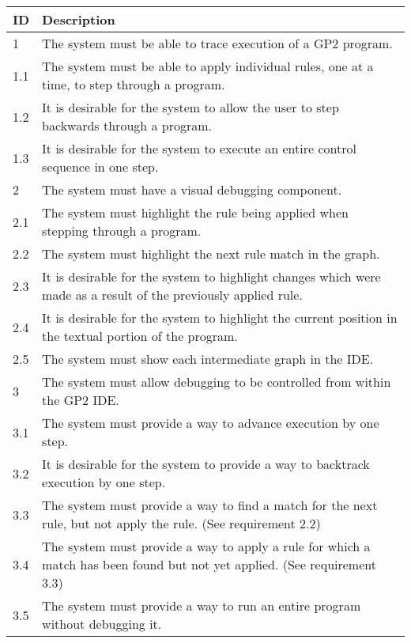 \documentclass[authoryearcitations]{UoYCSproject}
\begin{document}
\begin{table}[tbp]
    \begin{tabularx}{\linewidth}{|l|X|}
        \hline
        \textbf{ID} & \textbf{Description} \\
        \hline
        1    &  The system must be able to trace execution of a GP2 program. \\ \hline
        1.1  &  The system must be able to apply individual rules, one at a time,
                to step through a program. \\ \hline
        1.2  &  It is desirable for the system to allow the user to step
                backwards through a program. \\ \hline
        1.3  &  It is desirable for the system to execute an entire control sequence
                in one step. \\ \hline

        2    &  The system must have a visual debugging component. \\ \hline
        2.1  &  The system must highlight the rule being applied when stepping
                through a program. \\ \hline
        2.2  &  The system must highlight the next rule match in the graph. \\ \hline
        2.3  &  It is desirable for the system to highlight changes which were
                made as a result of the previously applied rule. \\ \hline
        2.4  &  It is desirable for the system to highlight the current position
                in the textual portion of the program. \\ \hline
        2.5  &  The system must show each intermediate graph in the IDE. \\ \hline

        3    &  The system must allow debugging to be controlled from within the
                GP2 IDE. \\ \hline
        3.1  &  The system must provide a way to advance execution by one step. \\ \hline
        3.2  &  It is desirable for the system to provide a way to backtrack
                execution by one step. \\ \hline
        3.3  &  The system must provide a way to find a match for the next rule,
                but not apply the rule. (See requirement 2.2) \\ \hline
        3.4  &  The system must provide a way to apply a rule for which a match
                has been found but not yet applied. (See requirement 3.3) \\ \hline
        3.5  &  The system must provide a way to run an entire program without
                debugging it. \\ \hline


\end{tabularx}
\end{table}
\end{document}
